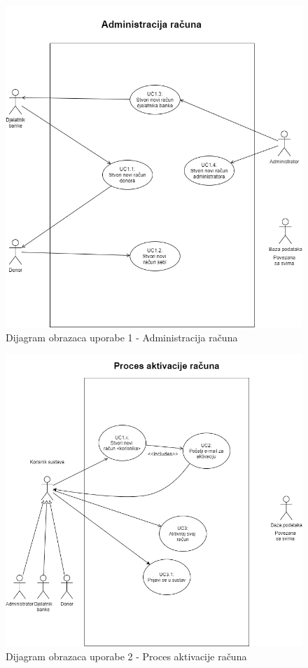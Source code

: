 				\begin{figure}[H]
    			\includegraphics[scale=0.6]{slike/UC1.png} %
    			\centering
    			\caption{Dijagram obrazaca uporabe 1 - Administracija računa}
    			\label{fig:promjene}
    	    	\end{figure}
    	    	
				\begin{figure}[H]
    			\includegraphics[scale=0.6]{slike/UC2.png} %
    			\centering
    			\caption{Dijagram obrazaca uporabe 2 - Proces aktivacije računa}
    			\label{fig:promjene}
    	    	\end{figure}
    	    	
